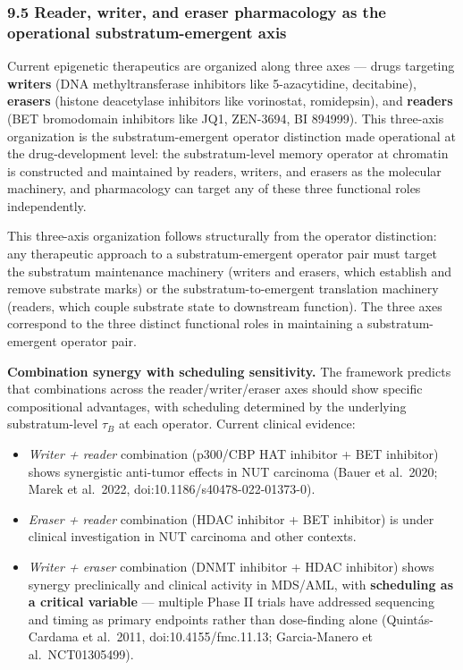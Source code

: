 \documentclass[
]{article}
\providecommand{\tightlist}{%
  \setlength{\itemsep}{0pt}\setlength{\parskip}{0pt}}
\begin{document}
\hypertarget{reader-writer-and-eraser-pharmacology-as-the-operational-substratum-emergent-axis}{%
\subsubsection{9.5 Reader, writer, and eraser pharmacology as the
operational substratum-emergent
axis}\label{reader-writer-and-eraser-pharmacology-as-the-operational-substratum-emergent-axis}}

Current epigenetic therapeutics are organized along three axes --- drugs
targeting \textbf{writers} (DNA methyltransferase inhibitors like
5-azacytidine, decitabine), \textbf{erasers} (histone deacetylase
inhibitors like vorinostat, romidepsin), and \textbf{readers} (BET
bromodomain inhibitors like JQ1, ZEN-3694, BI 894999). This three-axis
organization is the substratum-emergent operator distinction made
operational at the drug-development level: the substratum-level memory
operator at chromatin is constructed and maintained by readers, writers,
and erasers as the molecular machinery, and pharmacology can target any
of these three functional roles independently.

This three-axis organization follows structurally from the operator
distinction: any therapeutic approach to a substratum-emergent operator
pair must target the substratum maintenance machinery (writers and
erasers, which establish and remove substrate marks) or the
substratum-to-emergent translation machinery (readers, which couple
substrate state to downstream function). The three axes correspond to
the three distinct functional roles in maintaining a substratum-emergent
operator pair.

\textbf{Combination synergy with scheduling sensitivity.} The framework
predicts that combinations across the reader/writer/eraser axes should
show specific compositional advantages, with scheduling determined by
the underlying substratum-level \(\tau_B\) at each operator. Current
clinical evidence:

\begin{itemize}
\tightlist
\item
  \emph{Writer + reader} combination (p300/CBP HAT inhibitor + BET
  inhibitor) shows synergistic anti-tumor effects in NUT carcinoma
  (Bauer et al.~2020; Marek et al.~2022,
  doi:10.1186/s40478-022-01373-0).
\item
  \emph{Eraser + reader} combination (HDAC inhibitor + BET inhibitor) is
  under clinical investigation in NUT carcinoma and other contexts.
\item
  \emph{Writer + eraser} combination (DNMT inhibitor + HDAC inhibitor)
  shows synergy preclinically and clinical activity in MDS/AML, with
  \textbf{scheduling as a critical variable} --- multiple Phase II
  trials have addressed sequencing and timing as primary endpoints
  rather than dose-finding alone (Quintás-Cardama et al.~2011,
  doi:10.4155/fmc.11.13; Garcia-Manero et al.~NCT01305499).
\end{itemize}
\end{document}
